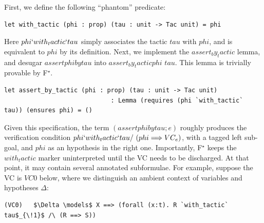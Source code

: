 \documentclass[runningheads]{llncs}
\newcommand\fstar{F$^\star$\xspace}
\newcommand{\comm}[3]{\ifcheckpagebudget\else\ifdraft{{\color{#1}[#2: #3]}}\fi\fi}
\newcommand{\nik}[1]{\comm{dkpurple}{Nik}{#1}}
\newcommand{\guido}[1]{\comm{blue}{Guido}{#1}}
\begin{document}
First, we define the following ``phantom'' predicate:
%
\begin{lstlisting}
let with_tactic (phi : prop) (tau : unit -> Tac unit) = phi
\end{lstlisting}
%
Here \ls$phi `with_tactic` tau$ simply associates the tactic \ls$tau$
with \ls$phi$, and is equivalent to \ls$phi$ by its definition.
%
Next, we implement the \ls$assert_by_tactic$ lemma, and desugar
\ls$assert phi by tau$ into \ls$assert_by_tactic phi$\! \ls$tau$.
%
This lemma is trivially provable by \fstar. %
%
\begin{lstlisting}
let assert_by_tactic (phi : prop) (tau : unit -> Tac unit)
                             : Lemma (requires (phi `with_tactic` tau)) (ensures phi) = ()
\end{lstlisting}
%
Given this specification,
the term \ls$(assert phi by tau; e)$ roughly produces the verification
condition
\ls$phi `with_tactic` tau /\ (phi ==> VC_e)$,
with a tagged left sub-goal,
and \ls$phi$ as an hypothesis
in the right one.
%
Importantly, \fstar keeps the \ls$with_tactic$ marker uninterpreted until the VC
needs to be discharged.
%
At that point, it may contain several annotated subformulae.
%
For example, suppose the VC is \ls$VC0$ below, where we distinguish
an ambient context of variables and hypotheses $\Delta$:
\begin{lstlisting}
(VC0)   $\Delta \models$ X ==> (forall (x:t). R `with_tactic` tau$_{\!1}$ /\ (R ==> S))
\end{lstlisting}
%
%
\end{document}
